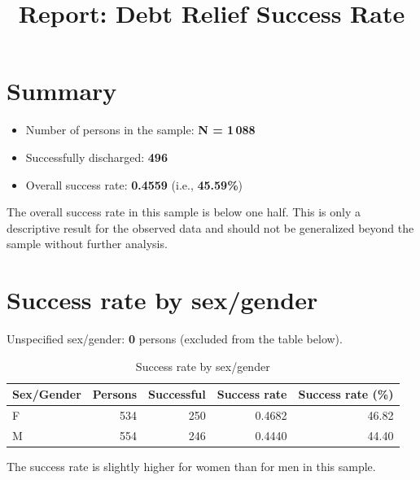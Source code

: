 \documentclass[11pt,a4paper]{article}
\title{Report: Debt Relief Success Rate}
\author{}
\date{}
\begin{document}
\maketitle

\section{Summary}
\begin{itemize}
  \item Number of persons in the sample: \textbf{N = 1\,088}
  \item Successfully discharged: \textbf{496}
  \item Overall success rate: \textbf{0.4559} (i.e., \textbf{45.59\%})
\end{itemize}

The overall success rate in this sample is below one half. This is only a descriptive result for the observed data and should not be generalized beyond the sample without further analysis.

\section{Success rate by sex/gender}
Unspecified sex/gender: \textbf{0} persons (excluded from the table below).

\begin{table}[h]
\centering
\caption{Success rate by sex/gender}
\begin{tabular}{lrrrr}
\toprule
Sex/Gender & Persons & Successful & Success rate & Success rate (\%) \\
\midrule
F & 534 & 250 & 0.4682 & 46.82 \\
M & 554 & 246 & 0.4440 & 44.40 \\
\bottomrule
\end{tabular}
\end{table}

The success rate is slightly higher for women than for men in this sample.
\end{document}

